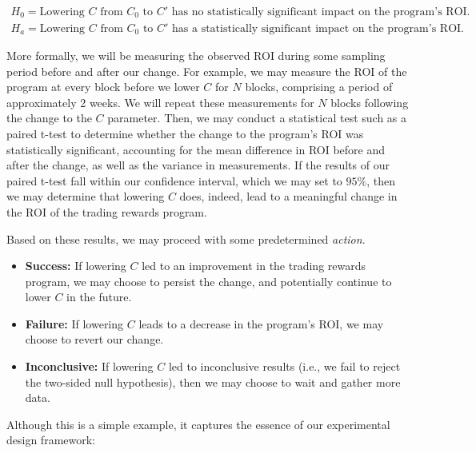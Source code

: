             \begin{align*}
                H_0 = \text{Lowering $C$ from $C_0$ to $C'$ has no statistically significant impact on the program's ROI.} \\
                H_a = \text{Lowering $C$ from $C_0$ to $C'$ has a statistically significant impact on the program's ROI.}
            \end{align*}

            More formally, we will be measuring the observed ROI during some sampling period before and after our change. For example, we may measure the ROI of the program at every block before we lower $C$ for $N$ blocks, comprising a period of approximately 2 weeks. We will repeat these measurements for $N$ blocks following the change to the $C$ parameter. Then, we may conduct a statistical test such as a paired t-test to determine whether the change to the program's ROI was statistically significant, accounting for the mean difference in ROI before and after the change, as well as the variance in measurements. If the results of our paired t-test fall within our confidence interval, which we may set to $95\%$, then we may determine that lowering $C$ does, indeed, lead to a meaningful change in the ROI of the trading rewards program. 

            Based on these results, we may proceed with some predetermined \textit{action}.

            \begin{itemize}
                \item \textbf{Success:} If lowering $C$ led to an improvement in the trading rewards program, we may choose to persist the change, and potentially continue to lower $C$ in the future.
                \item \textbf{Failure:} If lowering $C$ leads to a decrease in the program's ROI, we may choose to revert our change.
                \item \textbf{Inconclusive:} If lowering $C$ led to inconclusive results (i.e., we fail to reject the two-sided null hypothesis), then we may choose to wait and gather more data.
            \end{itemize}

            Although this is a simple example, it captures the essence of our experimental design framework:

